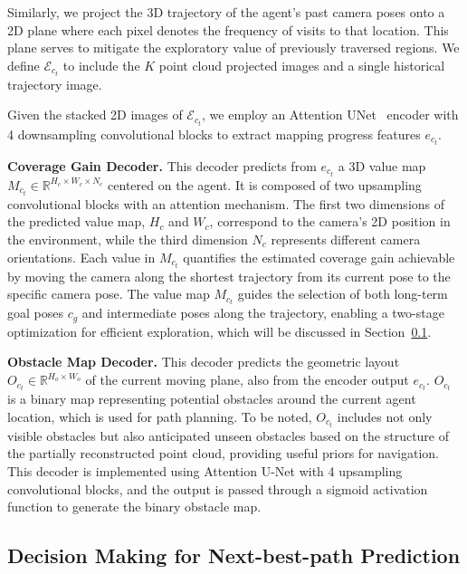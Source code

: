 Similarly, we project the 3D trajectory of the agent's past camera poses onto a 2D plane where each pixel denotes the frequency of visits to that location. This plane serves to mitigate the exploratory value of previously traversed regions. We define $\mathcal{E}_{c_t}$ to include the $K$ point cloud projected images and a single historical trajectory image.

Given the stacked 2D images of $\mathcal{E}_{c_t}$, we employ an Attention UNet~\citep{attentionunet} encoder with 4 downsampling convolutional blocks to extract mapping progress features $e_{c_t}$.



\textbf{Coverage Gain Decoder.}
%
This decoder predicts from $e_{c_t}$ a 3D value map $M_{c_t} \in \mathbb{R}^{H_c \times W_c \times N_c}$ centered on the agent.  
It is composed of two upsampling convolutional blocks with an attention mechanism.
The first two dimensions of the predicted value map, $H_c$ and $W_c$, correspond to the camera's 2D position in the environment, while the third dimension $N_c$ represents different camera orientations. 
Each value in $M_{c_t}$ quantifies the estimated coverage gain achievable by moving the camera along the shortest trajectory from its current pose to the specific camera pose. 
The value map $M_{c_t}$ guides the selection of both long-term goal poses $c_g$ and intermediate poses along the trajectory, enabling a two-stage optimization for efficient exploration, which will be discussed in Section~\ref{sec:method_decisionmaking}.


\textbf{Obstacle Map Decoder.} 
%
This decoder predicts the geometric layout $O_{c_t} \in \mathbb{R}^{H_o \times W_o}$ of the current moving plane, also from the encoder output $e_{c_t}$. $O_{c_t}$ is a binary map representing potential obstacles around the current agent location, which is used for path planning. To be noted, $O_{c_t}$ includes not only visible obstacles but also anticipated unseen obstacles based on the structure of the partially reconstructed point cloud, providing useful priors for navigation.
%
This decoder is implemented using  Attention U-Net with 4 upsampling convolutional blocks, and the output is passed through a sigmoid activation function to generate the binary obstacle map.


\subsection{Decision Making for Next-best-path Prediction}
\label{sec:method_decisionmaking} 

